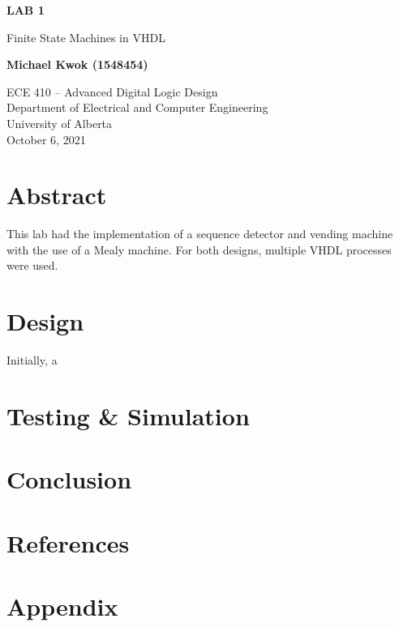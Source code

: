 \documentclass[12pt]{article}
\begin{document}
\begin{titlepage}
    \begin{center}
        \vspace*{1cm}

        \textbf{LAB 1}

        \vspace{0.5cm}

        Finite State Machines in VHDL

        \vspace{1.5cm}

        \textbf{Michael Kwok (1548454)}

        \vfill

        ECE 410 -- Advanced Digital Logic Design\\
        Department of Electrical and Computer Engineering\\
        University of Alberta\\
        October 6, 2021

    \end{center}
\end{titlepage}

\tableofcontents

\pagebreak

\section{Abstract}

This lab had the implementation of a sequence detector and vending machine with the use of a Mealy machine. For both designs, multiple VHDL processes were used.

\section{Design}

Initially, a

\section{Testing \& Simulation}

\section{Conclusion}

\section{References}

\pagebreak
\section{Appendix}

\renewcommand{\thepage}{}
\end{document}
